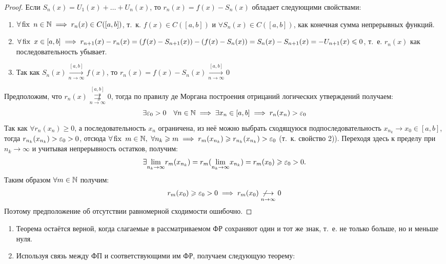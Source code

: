 \documentclass[../../main.tex]{subfiles}
\begin{document}
\begin{proof}
Если $S_n(x) = U_1(x) + \ldots + U_n(x)$, то $r_n(x) = f(x) - S_n(x)$ обладает
следующими свойствами:
	\begin{enumerate}
		\item $\forall \operatorname{fix} \ n \in \mathbb{N} \implies 
  r_n(x) \in C([a,b])$, т.~к. $f(x) \in C([a,b])$ и
	$\forall S_n(x) \in C([a,b])$, как конечная сумма непрерывных функций.
		\item $\forall \operatorname{fix} \ x \in [a,b] \implies 
	r_{n+1}(x) - r_n(x) = (f(x) - S_{n+1}(x)) - (f(x) - S_n(x)) = 
	S_n(x) - S_{n+1}(x)= -U_{n+1}(x) \leqslant 0$, т.~е.
	$r_n(x)$ как последовательность убывает.
		\item Так как $S_n(x) \overset{[a,b]}
	{\underset{n \to \infty}\longrightarrow} f(x)$, то 
	$r_n(x) = f(x) - S_n(x) \overset{[a,b]}
	{\underset{n \to \infty}\longrightarrow} 0$
	\end{enumerate}
Предположим, что $r_n(x) \overset{[a,b]}
{\underset{n \to \infty}{\not \rightrightarrows}} 0$, тогда по правилу
де Моргана построения отрицаний логических утверждений получаем: 
\[
\exists \varepsilon_0 > 0 \quad \forall n \in \mathbb{N} \implies 
\exists x_n \in [a,b] \implies r_n(x_n) > \varepsilon_0
\]
Так как $\forall r_n(x_n) \geq 0$, а последовательность $x_n$ ограничена,
из неё можно выбрать сходящуюся подпоследовательность 
$x_{n_k} \to x_0 \in [a,b]$, тогда $r_{n_k}(x_{n_k}) > \varepsilon_0 > 0$, отсюда
$\forall \fix \ m \in \N, \ \forall n_k \geq m \implies r_m(x_{n_k}) \geq
r_{n_k}(x_{n_k}) > \eps_0$ (т.~к. свойство 2)). Переходя здесь к пределу при 
$n_k \to \infty$ и учитывая непрерывность остатков, получим:
\[
\exists \underset{n_k \to \infty}{\lim} r_m(x_{n_k}) = 
r_m(\underset{n_k \to \infty}{\lim}x_{n_k}) = r_m(x_0) \geqslant
\varepsilon_0 > 0.
\]
Таким образом $\forall m \in \mathbb{N}$ получим: 
\[
r_m(x_0) \geqslant \varepsilon_0 > 0 \implies
r_m(x_0) \underset{n \to \infty}{\not \longrightarrow} 0
\]
Поэтому предположение об отсутствии равномерной сходимости ошибочно.
\end{proof}

\begin{rems}
	\;
	
	\begin{enumerate}
		\item Теорема остаётся верной, когда слагаемые в рассматриваемом ФР
	сохраняют один и тот же знак, т.~е. не только больше, но и меньше нуля.
		\item Используя связь между ФП и соответствующими им ФР, получаем
	следующую теорему:
	\end{enumerate}
\end{rems}	
\end{document}
